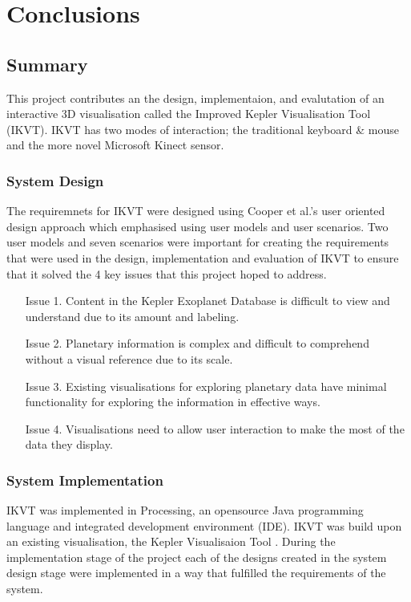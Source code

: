 \chapter{Conclusions}\label{C:con}
\section{Summary}
This project contributes an the design, implementaion, and evalutation of an
interactive 3D visualisation called the Improved Kepler Visualisation Tool
(IKVT). IKVT has two modes of interaction; the traditional keyboard \& mouse and
the more novel Microsoft Kinect sensor. 

\subsection{System Design}
The requiremnets for IKVT were designed using Cooper et al.'s user oriented
design approach which emphasised using user models and user scenarios.  Two user
models and seven scenarios were important for creating the requirements that
were used in the design, implementation and evaluation of IKVT to ensure that it
solved the 4 key issues that this project hoped to address.
\begin{enumerate}
 \item[Issue 1.] Content in the Kepler Exoplanet Database is difficult to view
and
understand due to its amount and labeling.
 \item[Issue 2.] Planetary information is complex and difficult to comprehend
without
a visual reference due to its scale.
 \item[Issue 3.] Existing visualisations for exploring planetary data have
minimal
functionality for exploring the information in effective ways.
 \item[Issue 4.] Visualisations need to allow user interaction to make the most
of
the data they display.
\end{enumerate}

\subsection{System Implementation}
IKVT was implemented in Processing, an opensource Java programming language and
integrated development environment (IDE). IKVT was build upon an existing
visualisation, the Kepler Visualisaion Tool \cite{kepler_github,
kepler_article}. During the implementation stage of the project each of the
designs created in the system design stage were implemented in a way that
fulfilled the requirements of the system. 


